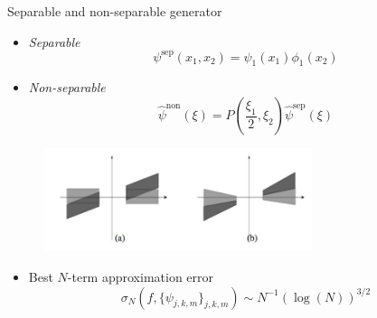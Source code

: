 \begin{frame}{Separable and non-separable generator}
\begin{minipage}{0.48\textwidth}
\begin{itemize}
\item\textit{Separable}
$$
\psi^{\text{sep}}(x_1,x_2)=\psi_1(x_1)\phi_1(x_2)
$$
\end{itemize}
\end{minipage}  \hfill
\pause
\begin{minipage}{0.5\textwidth}
\begin{itemize}
\item\textit{Non-separable}
$$
\hat{\psi}^{\text{non}}(\xi)=P\left(\frac{\xi_1}{2},\xi_2\right)\hat{\psi}^{\text{sep}}(\xi)
$$
\end{itemize}
\end{minipage}
\pause
\begin{figure}[h!]
\centering
\includegraphics[width=0.7\textwidth]{./Images/separable_nonseparable}
\end{figure}
\pause
\begin{itemize}
\item Best $N$-term approximation error
$$
\sigma_N(f,\{\psi_{j,k,m}\}_{j,k,m})\sim N^{-1}(\log(N))^{3/2}
$$
\end{itemize}
\end{frame}

